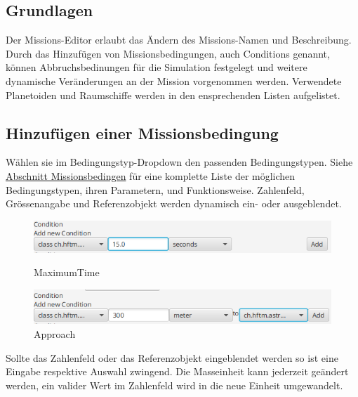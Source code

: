 \subsection{Grundlagen}
Der Missions-Editor erlaubt das Ändern des Missions-Namen und Beschreibung. Durch das Hinzufügen von Missionsbedingungen, auch Conditions genannt, können Abbruchsbedinungen für die Simulation festgelegt und weitere dynamische Veränderungen an der Mission vorgenommen werden. Verwendete Planetoiden und Raumschiffe werden in den ensprechenden Listen aufgelistet.

\hypertarget{addcondition}{\subsection{Hinzufügen einer Missionsbedingung}}
Wählen sie im Bedingungstyp-Dropdown den passenden Bedingungstypen.
Siehe \hyperlink{conditiontable}{Abschnitt Missionsbedingen} für eine komplette Liste der möglichen Bedingungstypen, ihren Parametern, und Funktionsweise.
Zahlenfeld, Grössenangabe und Referenzobjekt werden dynamisch ein- oder ausgeblendet.

\begin{figure}[H]
	\centering
	\begin{minipage}[b]{0.45\textwidth}
		\includegraphics[width=\textwidth]{res/conditionmaxtime.png}
		\caption{MaximumTime}
	\end{minipage}
	\hfill
	\begin{minipage}[b]{0.45\textwidth}
		\includegraphics[width=\textwidth]{res/conditionapproach.png}
		\caption{Approach}
	\end{minipage}
\end{figure}

Sollte das Zahlenfeld oder das Referenzobjekt eingeblendet werden so ist eine Eingabe respektive Auswahl zwingend.
Die Masseinheit kann jederzeit geändert werden, ein valider Wert im Zahlenfeld wird in die neue Einheit umgewandelt.

